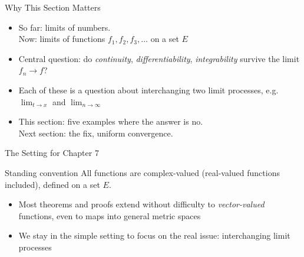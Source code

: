 \documentclass[aspectratio=169,12pt,t]{beamer}
\begin{document}
{%
\begin{frame}{Why This Section Matters}

  \begin{hlbox}  \begin{itemize}
    \item So far: limits of \alert{numbers}.\\
      Now: limits of \alert{functions} $f_1, f_2, f_3, \dots$ on a set $E$
    \item Central question: do \emph{continuity}, \emph{differentiability},
      \emph{integrability} \alert{survive} the limit $f_n \to f$?
    \item Each of these is a question about \alert{interchanging two limit
      processes}, e.g.\ $\lim_{t \to x}$ and $\lim_{n \to \infty}$
    \item This section: five examples where the answer is \alert{no}.\\
      Next section: the fix, \alert{uniform convergence}.
  \end{itemize}
  \end{hlbox}

\end{frame}

\begin{frame}{The Setting for Chapter 7}
  \begin{remblock}{Standing convention}
    All functions are \alert{complex-valued} (real-valued functions included),
    defined on a set $E$.
  \end{remblock}
  \begin{hlbox}

  \vspace{0.6em}
  \begin{itemize}
    \item Most theorems and proofs extend without difficulty to
      \emph{vector-valued} functions, even to maps into general metric spaces
    \item We stay in the simple setting to focus on the real issue:
      \alert{interchanging limit processes}
  \end{itemize}
  \end{hlbox}


\end{frame}}
\end{document}
